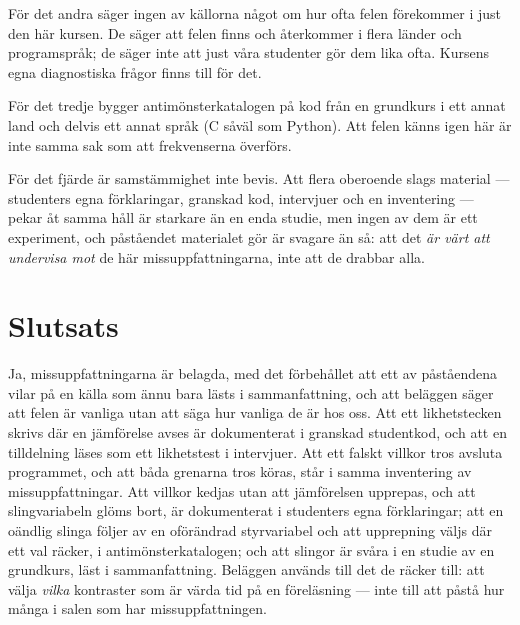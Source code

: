 För det andra säger ingen av källorna något om hur ofta felen
förekommer i just den här kursen.  De säger att felen finns och
återkommer i flera länder och programspråk; de säger inte att just våra
studenter gör dem lika ofta.  Kursens egna diagnostiska frågor finns
till för det.

För det tredje bygger antimönsterkatalogen på kod från en
grundkurs i ett annat land och delvis ett annat språk (C såväl som
Python).  Att felen känns igen här är inte samma sak som att frekvenserna
överförs.

För det fjärde är samstämmighet inte bevis.  Att flera oberoende slags
material --- studenters egna förklaringar, granskad kod, intervjuer och
en inventering --- pekar åt samma håll är starkare än en enda studie,
men ingen av dem är ett experiment, och påståendet materialet gör är
svagare än så: att det \emph{är värt att undervisa mot} de här
missuppfattningarna, inte att de drabbar alla.

\section{Slutsats}
\label{sec:cond-slutsats}

Ja, missuppfattningarna är belagda, med det förbehållet att ett av
påståendena vilar på en källa som ännu bara lästs i sammanfattning, och
att beläggen säger att felen är vanliga utan att säga hur vanliga de är
hos oss.  Att ett likhetstecken skrivs där en jämförelse avses är
dokumenterat i granskad studentkod\autocite{Bosse2021Antipatterns}, och
att en tilldelning läses som ett likhetstest i
intervjuer\autocite{Plass2015Variables}.  Att ett falskt villkor tros
avsluta programmet, och att båda grenarna tros köras, står i samma
inventering av missuppfattningar\autocite[tabell~A.1,
s.~360]{Sorva2012Dissertation}.
Att villkor kedjas utan att jämförelsen upprepas, och att slingvariabeln
glöms bort, är dokumenterat i studenters egna
förklaringar\autocite{GuoMarkelZhang2020}; att en oändlig slinga följer
av en oförändrad styrvariabel och att upprepning väljs där ett val
räcker, i antimönsterkatalogen\autocite{Bosse2021Antipatterns}; och att
slingor är svåra i en studie av en grundkurs, läst i
sammanfattning\autocite{Eckert2022Loops}.%
  Beläggen används till det de
räcker till: att välja \emph{vilka} kontraster som är värda tid på en
föreläsning --- inte till att påstå hur många i salen som har
missuppfattningen.


